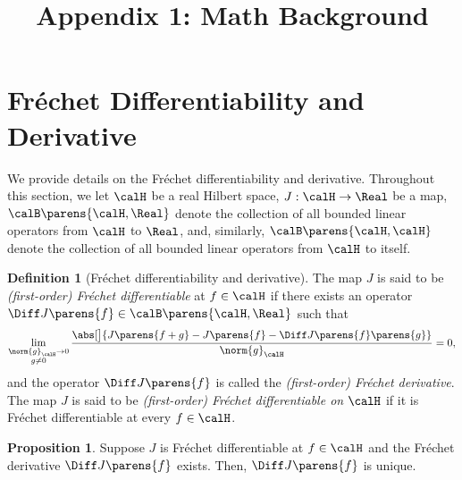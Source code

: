 \documentclass[12pt]{article}
\title{ \setstretch{1.0} \textbf{ \Large Appendix 1: Math Background}}
\author{}
\date{}
\theoremstyle{definition}
\newtheorem{definition}{Definition}
\theoremstyle{theorem}
\newtheorem{proposition}{Proposition}
\theoremstyle{remark}
\begin{document}
\thispagestyle{plain}
\maketitle


\tableofcontents

\newpage

\section{Fr{\'e}chet Differentiability and Derivative}\label{section-frechet-differentiable}

We provide details on the Fr{\'e}chet differentiability and derivative. Throughout this section, we let $\calH$ be a real Hilbert space, $J: \calH \to \Real$ be a map, $\calB \parens{\calH, \Real}$ denote the collection of all bounded linear operators from $\calH$ to $\Real$, and, similarly, $\calB \parens{\calH, \calH}$ denote the collection of all bounded linear operators from $\calH$ to itself. 

\begin{definition}[Fr{\'e}chet differentiability and derivative]\label{def-frechet-differentiable}
	The map $J$ is said to be \textit{(first-order) Fr{\'e}chet differentiable} at $f \in \calH$ if there exists an operator $\Diff J \parens{f} \in \calB \parens{\calH, \Real}$ such that 
	\begin{align}\label{eq-frederivative}
	    \lim_{\substack{\norm{g}_{\calH} \to 0 \\ g \neq 0}} \frac{\abs[\big]{J \parens{f + g} - J \parens{f} - \Diff J \parens{f}\parens{g}}}{\norm{g}_{\calH}} = 0, 
	\end{align}
	and the operator $\Diff J \parens{f}$ is called the \textit{(first-order) Fr{\'e}chet derivative}. The map $J$ is said to be \textit{(first-order) Fr{\'e}chet differentiable on $\calH$} if it is Fr{\'e}chet differentiable at every $f \in \calH$. 
\end{definition}

\begin{proposition}
	Suppose $J$ is Fr{\'e}chet differentiable at $f \in \calH$ and the Fr{\'e}chet derivative $\Diff J \parens{f}$ exists. Then, $\Diff J \parens{f}$ is unique. 
\end{proposition}
\end{document}
